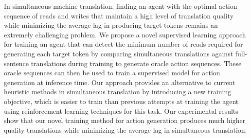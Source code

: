 In simultaneous machine translation, finding an agent with the optimal action sequence of reads and writes that maintain a high level of translation quality while minimizing the average lag in producing target tokens remains an extremely challenging problem. We propose a novel supervised learning approach for training an agent that can detect the minimum number of reads required for generating each target token by comparing simultaneous translations against full-sentence translations during training to generate oracle action sequences. These oracle sequences can then be used to train a supervised model for action generation at inference time. Our approach provides an alternative to current heuristic methods in simultaneous translation by introducing a new training objective, which is easier to train than previous attempts at training the agent using reinforcement learning techniques for this task. Our experimental results show that our novel training method for action generation produces much higher quality translations while minimizing the average lag in simultaneous translation.
